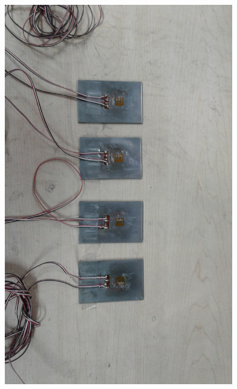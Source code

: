\begin{center}
\includegraphics[width=0.75\textwidth]{src/ch3/probetas_instrumentadas.jpg}
\label{fig:probetas_instrumentadas}
\end{center}
